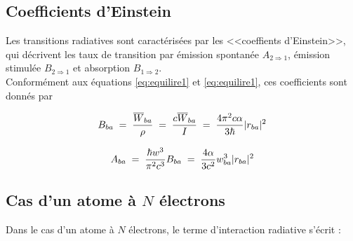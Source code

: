     \subsection{Coefficients d'Einstein}



Les transitions radiatives sont caractérisées par les <<coeffients d'Einstein>>, qui décrivent les taux de transition par émission spontanée $A_{2\Rightarrow1}$, émission stimulée $B_{2\Rightarrow 1}$ et absorption $B_{1\Rightarrow2}$.\\
Conformément aux équations \eqref{eq:equilire1} et \eqref{eq:equilire1}, ces coefficients sont donnés par

\begin{equation}
    B_{ba}\; = \; \dfrac{\overline{W}_{ba}}{\rho}\; = \; \dfrac{c\overline{W}_{ba}}{I}\; = \; \dfrac{4\pi^2 c \alpha}{3 \hbar}|r_{ba}|^2
\end{equation}

\begin{equation}
    A_{ba}\; = \; \dfrac{\hbar w^3}{\pi^2 c^3}B_{ba}\; = \; \dfrac{4 \alpha}{3 c^2}w_{ba}^3|r_{ba}|^2
\end{equation}





\subsection{Cas d'un atome à $N$ électrons}

Dans le cas d'un atome à $N$ électrons, le terme d'interaction radiative s'écrit :

